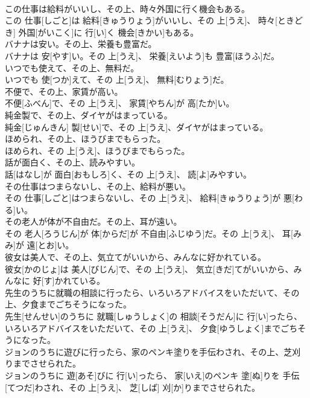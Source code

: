 \documentclass[8pt]{extreport}
\begin{document}
\begin{CJK}{UTF8}{min}
\\	この仕事は給料がいいし、その上、時々外国に行く機会もある。	
\\	この 仕事[しごと]は 給料[きゅうりょう]がいいし、その 上[うえ]、 時々[ときどき] 外国[がいこく]に 行[い]く 機会[きかい]もある。
\\	バナナは安い。その上、栄養も豊富だ。	
\\	バナナは 安[やす]い。その 上[うえ]、 栄養[えいよう]も 豊富[ほうふ]だ。
\\	いつでも使えて、その上、無料だ。	
\\	いつでも 使[つか]えて、その 上[うえ]、 無料[むりょう]だ。
\\	不便で、その上、家賃が高い。	
\\	不便[ふべん]で、その 上[うえ]、 家賃[やちん]が 高[たか]い。
\\	純金製で、その上、ダイヤがはまっている。	
\\	純金[じゅんきん] 製[せい]で、その 上[うえ]、ダイヤがはまっている。
\\	ほめられ、その上、ほうびまでもらった。	
\\	ほめられ、その 上[うえ]、ほうびまでもらった。
\\	話が面白く、その上、読みやすい。	
\\	話[はなし]が 面白[おもしろ]く、その 上[うえ]、 読[よ]みやすい。
\\	その仕事はつまらないし、その上、給料が悪い。	
\\	その 仕事[しごと]はつまらないし、その 上[うえ]、 給料[きゅうりょう]が 悪[わる]い。
\\	その老人が体が不自由だ。その上、耳が遠い。	
\\	その 老人[ろうじん]が 体[からだ]が 不自由[ふじゆう]だ。その 上[うえ]、 耳[みみ]が 遠[とお]い。
\\	彼女は美人で、その上、気立てがいいから、みんなに好かれている。	
\\	彼女[かのじょ]は 美人[びじん]で、その 上[うえ]、 気立[きだ]てがいいから、みんなに 好[す]かれている。
\\	先生のうちに就職の相談に行ったら、いろいろアドバイスをいただいて、その上、夕食までごちそうになった。	
\\	先生[せんせい]のうちに 就職[しゅうしょく]の 相談[そうだん]に 行[い]ったら、いろいろアドバイスをいただいて、その 上[うえ]、 夕食[ゆうしょく]までごちそうになった。
\\	ジョンのうちに遊びに行ったら、家のペンキ塗りを手伝わされ、その上、芝刈りまでさせられた。	
\\	ジョンのうちに 遊[あそ]びに 行[い]ったら、 家[いえ]のペンキ 塗[ぬ]りを 手伝[てつだ]わされ、その 上[うえ]、 芝[しば] 刈[か]りまでさせられた。

\end{CJK}
\end{document}
